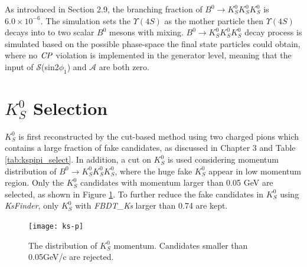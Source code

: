 As introduced in Section 2.9, the branching fraction of $B^0 \to K_S^0  K_S^0  K_S^0$ is $6.0 \times 10^{-6}$. The simulation sets the $\Upsilon(4S)$ as the mother particle then $\Upsilon(4S)$ decays into to two scalar $B^0$ mesons with mixing. $B^0 \to K_S^0  K_S^0  K_S^0$ decay process is simulated based on the possible phase-space the final state particles could obtain, where no $\it{CP}$ violation is implemented in the generator level, meaning that the input of $\mathcal{S}$(sin2$\phi_1$) and $\mathcal{A}$ are both zero. 
\section{$K_S^0$ Selection}
$K_S^0$ is first reconstructed by the cut-based method using two charged pions which contains a large fraction of fake candidates, as discussed in Chapter 3 and Table \ref{tab:kspipi_select}. In addition, a cut on $K_S^0$ is used considering momentum distribution of $B^0 \to K_S^0  K_S^0  K_S^0$, where the huge fake $K_S^0$ appear in low momentum region. Only the $K_S^0$ candidates with momentum larger than 0.05 GeV are selected, as shown in Figure \ref{fig:ks-p}. To further reduce the fake candidates in $K_S^0$ using \textit{KsFinder}, only $K_S^0$ with \textit{FBDT\_Ks} larger than 0.74 are kept.
\begin{figure}[ht]
	\centering
	\texttt{[image: ks-p]}
	\caption{The distribution of $K_S^0$ momentum. Candidates smaller than 0.05GeV/c are rejected.}
	\label{fig:ks-p}
\end{figure}

